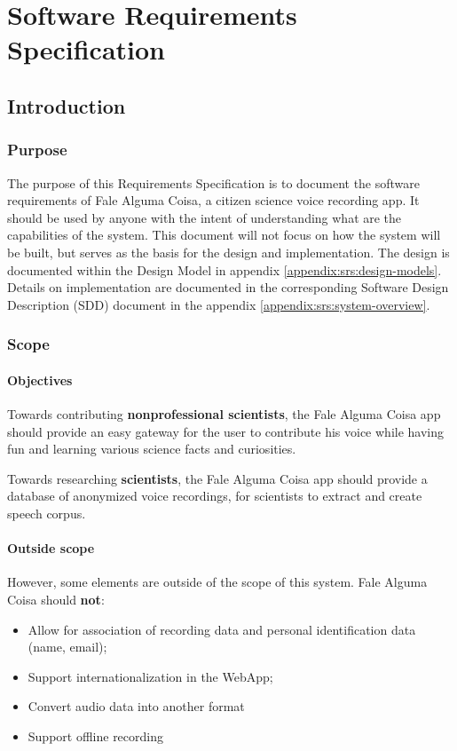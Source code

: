 \chapter{Software Requirements Specification}
\label{appendix:srs}

\section{Introduction}
\subsection{Purpose}
\label{appendix:srs:purpose}

The purpose of this Requirements Specification is to document the software requirements of Fale Alguma Coisa, a citizen science voice recording app. It should be used by anyone with the intent of understanding what are the capabilities of the system. This document will not focus on how the system will be built, but serves as the basis for the design and implementation. The design is documented within the Design Model in appendix \ref{appendix:srs:design-models}. Details on implementation are documented in the corresponding Software Design Description (SDD) document in the appendix \ref{appendix:srs:system-overview}.

\subsection{Scope}
\label{appendix:srs:scope}

\subsubsection{Objectives}

Towards contributing \textbf{nonprofessional scientists}, the Fale Alguma Coisa app should provide an easy gateway for the user to contribute his voice while having fun and learning various science facts and curiosities.

Towards researching \textbf{scientists}, the Fale Alguma Coisa app should provide a database of anonymized voice recordings, for scientists to extract and create speech corpus.

\subsubsection{Outside scope}

However, some elements are outside of the scope of this system. Fale Alguma Coisa should \textbf{not}:
\begin{itemize}
    \item Allow for association of recording data and personal identification data (name, email);
    \item Support internationalization in the WebApp;
    \item Convert audio data into another format
    \item Support offline recording
\end{itemize}

